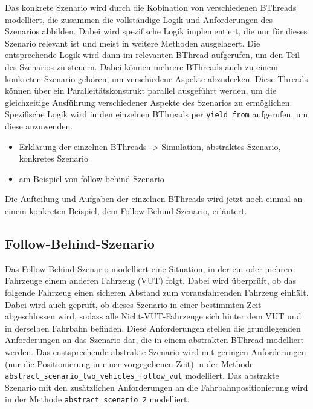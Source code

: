 Das konkrete Szenario wird durch die Kobination von verschiedenen BThreads modelliert, die zusammen die vollständige Logik und Anforderungen des Szenarios abbilden. Dabei wird spezifische Logik implementiert, die nur für dieses Szenario relevant ist und meist in weitere Methoden ausgelagert.
Die entsprechende Logik wird dann im relevanten BThread aufgerufen, um den Teil des Szenarios zu steuern. Dabei können mehrere BThreads auch zu einem konkreten Szenario gehören, um verschiedene Aspekte abzudecken.
Diese Threads können über ein Paralleitätskonstrukt parallel ausgeführt werden, um die gleichzeitige Ausführung verschiedener Aspekte des Szenarios zu ermöglichen. Spezifische Logik wird in den einzelnen BThreads per \texttt{yield from} aufgerufen, um diese anzuwenden.
\begin{itemize}
    \item Erklärung der einzelnen BThreads -> Simulation, abstraktes Szenario, konkretes Szenario
    \item am Beispiel von follow-behind-Szenario
\end{itemize}

Die Aufteilung und Aufgaben der einzelnen BThreads wird jetzt noch einmal an einem konkreten Beispiel, dem Follow-Behind-Szenario, erläutert.
\subsection{Follow-Behind-Szenario}
Das Follow-Behind-Szenario modelliert eine Situation, in der ein oder mehrere Fahrzeuge einem anderen Fahrzeug (VUT) folgt. Dabei wird überprüft, ob das folgende Fahrzeug einen sicheren Abstand zum vorausfahrenden Fahrzeug einhält.
Dabei wird auch geprüft, ob dieses Szenario in einer bestimmten Zeit abgeschlossen wird, sodass alle Nicht-VUT-Fahrzeuge sich hinter dem VUT und in derselben Fahrbahn befinden.
Diese Anforderungen stellen die grundlegenden Anforderungen an das Szenario dar, die in einem abstrakten BThread modelliert werden. Das enstsprechende abstrakte Szenario wird mit geringen Anforderungen (nur die Positionierung in einer vorgegebenen Zeit) in der Methode \texttt{abstract_scenario_two_vehicles_follow_vut} modelliert.
Das abstrakte Szenario mit den zusätzlichen Anforderungen an die Fahrbahnpositionierung wird in der Methode \texttt{abstract_scenario_2} modelliert.

